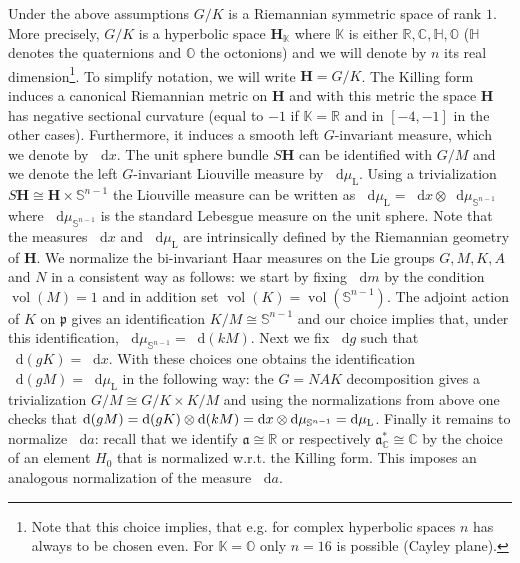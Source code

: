 \documentclass[10pt]{amsart}
\theoremstyle{definition}
\DeclareMathOperator{\vol}{vol}
\newcommand{\rml}{\mathrm{L}}
\newcommand{\rr}{\mathbb{R}}
\newcommand{\cc}{\mathbb{C}}
\newcommand{\hh}{\mathbb{H}}
\newcommand{\bfh}{\mathbf{H}}
\newcommand{\R}{\mathbb R}
\newcommand{\intd}{\mathop{}\!\mathrm{d}}
\newcommand{\p}{\mathfrak p}
\renewcommand{\a}{\mathfrak a}
\begin{document}
Under the above assumptions $G/K$ is a Riemannian symmetric space of rank $1$. More precisely, $G/K$ is a hyperbolic space ${\bfh}_{\mathbb{K}}$ where $\mathbb{K}$ is either $\rr,\cc,\hh,\mathbb{O}$ ($\hh$ denotes the quaternions and $\mathbb{O}$ the octonions) and we will denote by $n$ its real dimension\footnote{Note that this choice implies, that e.g. for complex hyperbolic spaces $n$ has always to be chosen even. For $\mathbb{K}=\mathbb{O}$ only $n=16$ is possible (Cayley plane).}. To simplify notation, we will write ${\bfh}=G/K$. The Killing form induces a canonical Riemannian metric on ${\bfh}$ and with this metric the space $\bfh$ has negative sectional curvature (equal to $-1$ if $\mathbb{K}=\rr$ and in $[-4,-1]$ in the other cases). Furthermore, it induces a smooth left $G$-invariant measure, which we denote by $\intd x$. The unit sphere bundle $S{\bfh}$ can be identified with $G/M$ and we denote the left $G$-invariant Liouville measure by $\intd\mu_{\rml}$. Using a trivialization $S{\bfh} \cong {\bfh}\times \mathbb S^{n-1}$ the Liouville measure can be written as $\intd \mu_{\rml} = \intd x\otimes\intd \mu_{\mathbb S^{n-1}}$ where $\intd \mu_{\mathbb S^{n-1}}$ is the standard Lebesgue measure on the unit sphere. Note that the measures $\intd x$ and $\intd \mu_{\rml}$ are intrinsically defined by the Riemannian geometry of ${\bfh}$. We normalize the bi-invariant Haar measures on the Lie groups $G,M,K,A$ and $N$ in a consistent way as follows: we start by fixing $\intd m$ by the condition $\vol(M)=1$ and in addition set $\vol(K) = \vol(\mathbb S^ {n-1})$. The adjoint action of $K$ on $\p$ gives an identification $K/M
\cong \mathbb S^{n-1}$ and our choice implies that, under this identification, $\intd \mu_{\mathbb S^ {n-1}} = \intd (kM)$. Next we fix $\intd g$ such that $\intd (gK) = \intd x$. With these choices one obtains the identification $\intd (gM) = \intd \mu_{\rml}$ in the following way: the $G=NAK$ decomposition gives a trivialization $G/M\cong G/K\times K/M$ and using the normalizations from above one checks that $\intd(gM) = \intd (gK)\otimes \intd (kM)\linebreak= \intd x\otimes\intd \mu_{\mathbb S^{n-1}} = \intd \mu_{\rml}$. Finally it remains to normalize $\intd a$: recall that we identify $\a\cong \R$ or respectively $\a^*_\cc\cong \cc$ by the choice of an element $H_0$ that is normalized w.r.t. the Killing form. This imposes an analogous normalization of the measure $\intd a$.
\end{document}
